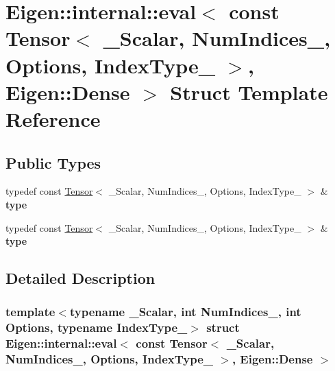 \hypertarget{struct_eigen_1_1internal_1_1eval_3_01const_01_tensor_3_01___scalar_00_01_num_indices___00_01_optc9dc50531ff0dd75e0889d13c2eb933e}{}\section{Eigen\+:\+:internal\+:\+:eval$<$ const Tensor$<$ \+\_\+\+Scalar, Num\+Indices\+\_\+, Options, Index\+Type\+\_\+ $>$, Eigen\+:\+:Dense $>$ Struct Template Reference}
\label{struct_eigen_1_1internal_1_1eval_3_01const_01_tensor_3_01___scalar_00_01_num_indices___00_01_optc9dc50531ff0dd75e0889d13c2eb933e}
\subsection*{Public Types}
\begin{DoxyCompactItemize}
\item 
\mbox{\label{struct_eigen_1_1internal_1_1eval_3_01const_01_tensor_3_01___scalar_00_01_num_indices___00_01_optc9dc50531ff0dd75e0889d13c2eb933e_aa4eb655eabd5f18acc41e546aa4dfdbd}} 
typedef const \hyperlink{class_eigen_1_1_tensor}{Tensor}$<$ \+\_\+\+Scalar, Num\+Indices\+\_\+, Options, Index\+Type\+\_\+ $>$ \& {\bfseries type}
\item 
\mbox{\label{struct_eigen_1_1internal_1_1eval_3_01const_01_tensor_3_01___scalar_00_01_num_indices___00_01_optc9dc50531ff0dd75e0889d13c2eb933e_aa4eb655eabd5f18acc41e546aa4dfdbd}} 
typedef const \hyperlink{class_eigen_1_1_tensor}{Tensor}$<$ \+\_\+\+Scalar, Num\+Indices\+\_\+, Options, Index\+Type\+\_\+ $>$ \& {\bfseries type}
\end{DoxyCompactItemize}


\subsection{Detailed Description}
\subsubsection*{template$<$typename \+\_\+\+Scalar, int Num\+Indices\+\_\+, int Options, typename Index\+Type\+\_\+$>$\newline
struct Eigen\+::internal\+::eval$<$ const Tensor$<$ \+\_\+\+Scalar, Num\+Indices\+\_\+, Options, Index\+Type\+\_\+ $>$, Eigen\+::\+Dense $>$}



